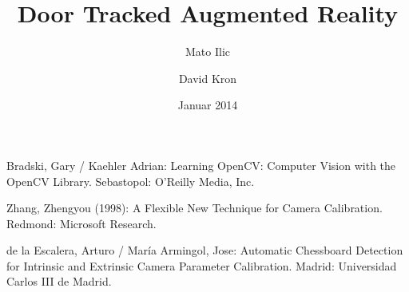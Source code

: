\documentclass[listof=totocnumbered,bibliography=totocnumbered,12pt,oneside]{scrreprt}
\numberwithin{equation}{subsection}
\begin{document}
\pagestyle{fancy}

\subject{Bachelor-Thesis}
\title{Door Tracked Augmented Reality}
\author{Mato Ilic \and David Kron}
\date{Januar 2014}
\publishers{Betreuer: Marcus Hudritsch\\Experte: Andreas Dürsteler}

\maketitle


\newpage

\tableofcontents
\newpage


\newpage


\newpage


\newpage


\newpage


\newpage


\newpage
\begin{thebibliography}{5}

Bradski, Gary / Kaehler Adrian:
Learning OpenCV: Computer Vision with the OpenCV Library.
Sebastopol: O'Reilly Media, Inc.

Zhang, Zhengyou (1998): A Flexible New Technique for Camera Calibration. 
Redmond: Microsoft Research.

de la Escalera, Arturo / María Armingol, Jose: Automatic Chessboard Detection for Intrinsic and Extrinsic Camera Parameter Calibration. 
Madrid: Universidad Carlos III de Madrid.

\end{thebibliography}
\end{document}
